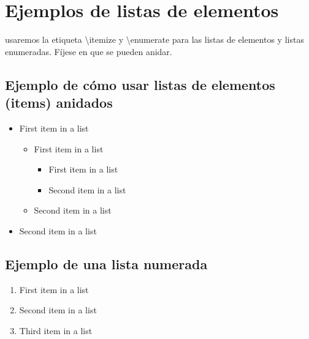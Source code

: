 
\section{Ejemplos de listas de elementos}

usaremos la etiqueta \textbackslash itemize y  \textbackslash enumerate para las listas de elementos y listas enumeradas. Fíjese en que se pueden anidar.


\subsection{Ejemplo de cómo usar listas de elementos (items) anidados}
\begin{itemize}
	\item First item in a list 
	\begin{itemize}
		\item First item in a list 
		\begin{itemize}
			\item First item in a list 
			\item Second item in a list 
		\end{itemize}
		\item Second item in a list 
	\end{itemize}
	\item Second item in a list 
\end{itemize}


\subsection{Ejemplo de una lista numerada}
\begin{enumerate}
	\item First item in a list 
	\item Second item in a list 
	\item Third item in a list
\end{enumerate}




